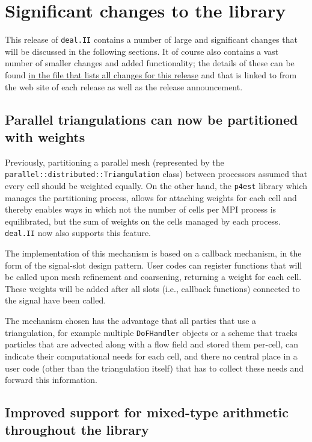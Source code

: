 \documentclass{ansarticle-preprint}
\newcommand{\specialword}[1]{\texttt{#1}}
\newcommand{\dealii}{{\specialword{deal.II}}}
\newcommand{\pfrst}{{\specialword{p4est}}}
\begin{document}
\section{Significant changes to the library}

This release of \dealii{} contains a number of large and significant changes
that will be discussed in the following sections. It of course also contains a
vast number of smaller changes and added functionality; the details of these
can be found
\href{https://www.dealii.org/8.4.0/doxygen/deal.II/changes_between_8_3_0_and_8_4.html}{in the file that lists all changes for this release}
and that is linked to from the web site of each release as well as the
release announcement.


\subsection{Parallel triangulations can now be partitioned with weights}

Previously, partitioning a parallel mesh (represented by the
\texttt{parallel::distributed::Triangulation} class) between
processors assumed that every cell should be weighted equally. On the
other hand, the \pfrst{} library which manages the partitioning
process, allows for attaching weights for each cell and thereby
enables ways in which not the number of cells per MPI process is
equilibrated, but the sum of weights on the cells managed by each
process. \dealii{} now also supports this feature.

The implementation of this mechanism is based on a callback mechanism,
in the form of the signal-slot design pattern. User codes can register
functions that will be called upon mesh refinement and coarsening,
returning a weight for each cell. These weights will be added after
all slots (i.e., callback functions) connected to the signal have been
called.

The mechanism chosen has the advantage that all parties that use a
triangulation, for example multiple \texttt{DoFHandler} objects or a
scheme that tracks particles that are advected along with a flow field
and stored them per-cell, can indicate their computational needs for
each cell, and there no central place in a user code (other than the
triangulation itself) that has to collect these needs and forward this
information.


\subsection{Improved support for mixed-type arithmetic throughout the
  library}
\end{document}
